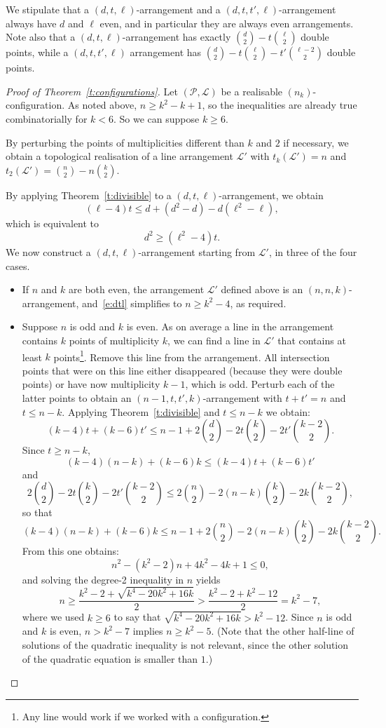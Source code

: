 \documentclass[a4paper,12pt, onesided]{amsart}
\theoremstyle{remark}
\numberwithin{figure}{section}
\numberwithin{equation}{section}
\newcommand{\cP}{\mathcal{P}}
\renewcommand{\L}{\mathcal{L}}
\begin{document}
We stipulate that a $(d,t,\ell)$-arrangement and a $(d,t,t',\ell)$-arrangement always have $d$ and $\ell$ even, and in particular they are always even arrangements.
Note also that a $(d,t,\ell)$-arrangement has exactly ${d \choose 2} - t{\ell \choose 2}$ double points, while a $(d,t,t',\ell)$ arrangement has ${d \choose 2} - t{\ell \choose 2} - t'{\ell-2 \choose 2}$ double points. 


\begin{proof}[Proof of Theorem~\ref{t:configurations}]
Let $(\cP, \L)$ be a realisable $(n_k)$-configuration.
As noted above, $n \ge k^2-k+1$, so the inequalities are already true combinatorially for $k < 6$.
So we can suppose $k \ge 6$.

By perturbing the points of multiplicities different than $k$ and $2$ if necessary, we obtain a topological realisation of a line arrangement $\L'$ with $t_k(\L') = n$ and $t_2(\L') = {n \choose 2} - n {k \choose 2}$.

By applying Theorem~\ref{t:divisible} to a $(d,t,\ell)$-arrangement, we obtain
\[
(\ell-4)t \le d + (d^2-d) - d(\ell^2-\ell),
\]
which is equivalent to
\begin{equation}\label{e:dtl}
d^2 \ge (\ell^2-4)t.
\end{equation}
We now construct a $(d,t,\ell)$-arrangement starting from $\L'$, in three of the four cases.

\begin{itemize}
\item If $n$ and $k$ are both even, the arrangement $\L'$ defined above is an $(n,n,k)$-arrangement, and~\eqref{e:dtl} simplifies to $n\ge k^2-4$, as required.

\item Suppose $n$ is odd and $k$ is even.
As on average a line in the arrangement contains $k$ points of multiplicity $k$, we can find a line in $\L'$ that contains at least $k$ points\footnote{Any line would work if we worked with a configuration.}.
Remove this line from the arrangement. 
All intersection points that were on this line either disappeared (because they were double points) or have now multiplicity $k-1$, which is odd. 
Perturb each of the latter points to obtain an $(n-1,t,t',k)$-arrangement with $t + t' = n$ and $t \le n-k$.
Applying Theorem~\ref{t:divisible} and $t \le n-k$ we obtain:
\[
(k-4)t + (k-6)t' \le n-1 + 2{d \choose 2} - 2t{k \choose 2} - 2t'{k-2 \choose 2}.
\]
Since $t \ge n-k$,
\[
(k-4)(n-k) + (k-6)k \le (k-4)t + (k-6)t'
\]
and
\[
2{d \choose 2} - 2t{k \choose 2} - 2t'{k-2 \choose 2} \le 2{n \choose 2} - 2(n-k){k \choose 2} - 2k{k-2 \choose 2},
\]
so that
\[
(k-4)(n-k) + (k-6)k \le n-1 + 2{n \choose 2} - 2(n-k){k \choose 2} - 2k{k-2 \choose 2}.
\]
From this one obtains:
\[
n^2 - (k^2-2)n + 4k^2-4k+1 \le 0,
\]
and solving the degree-2 inequality in $n$ yields
\[
n \ge \frac{k^2-2 + \sqrt{k^4-20k^2 + 16k}}2 > \frac{k^2-2 + k^2-12}2 = k^2-7,
\]
where we used $k \ge 6$ to say that $\sqrt{k^4-20k^2 + 16k} > k^2-12$.
Since $n$ is odd and $k$ is even, $n > k^2-7$ implies $n \ge k^2-5$.
(Note that the other half-line of solutions of the quadratic inequality is not relevant, since the other solution of the quadratic equation is smaller than $1$.)


\end{itemize}
\end{proof}
\end{document}
